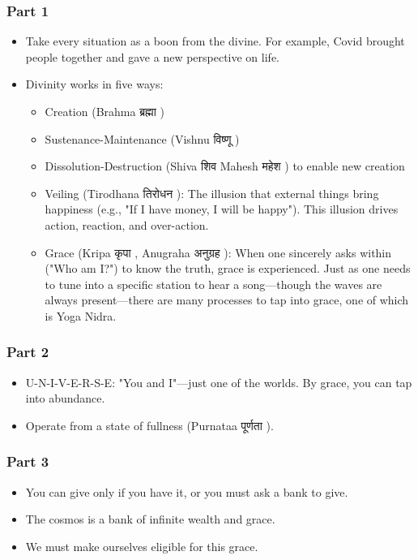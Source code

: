 \begin{frame}[fragile]\frametitle{Part 1}

\begin{itemize}
    \item Take every situation as a boon from the divine. For example, Covid brought people together and gave a new perspective on life.
    \item Divinity works in five ways:
    \begin{itemize}
        \item Creation (Brahma ब्रह्मा )
        \item Sustenance-Maintenance (Vishnu विष्णू )
        \item Dissolution-Destruction (Shiva शिव  Mahesh महेश ) to enable new creation
        \item Veiling (Tirodhana तिरोधन ): The illusion that external things bring happiness (e.g., "If I have money, I will be happy"). This illusion drives action, reaction, and over-action.
        \item Grace (Kripa कृपा , Anugraha अनुग्रह ): When one sincerely asks within ("Who am I?") to know the truth, grace is experienced. Just as one needs to tune into a specific station to hear a song—though the waves are always present—there are many processes to tap into grace, one of which is Yoga Nidra.
    \end{itemize}
\end{itemize}

\end{frame}

\begin{frame}[fragile]\frametitle{Part 2}

\begin{itemize}
    \item U-N-I-V-E-R-S-E: "You and I"—just one of the worlds. By grace, you can tap into abundance.
    \item Operate from a state of fullness (Purnataa पूर्णता ).
\end{itemize}

\end{frame}

\begin{frame}[fragile]\frametitle{Part 3}

\begin{itemize}
    \item You can give only if you have it, or you must ask a bank to give.
    \item The cosmos is a bank of infinite wealth and grace.
    \item We must make ourselves eligible for this grace.
\end{itemize}

\end{frame}

